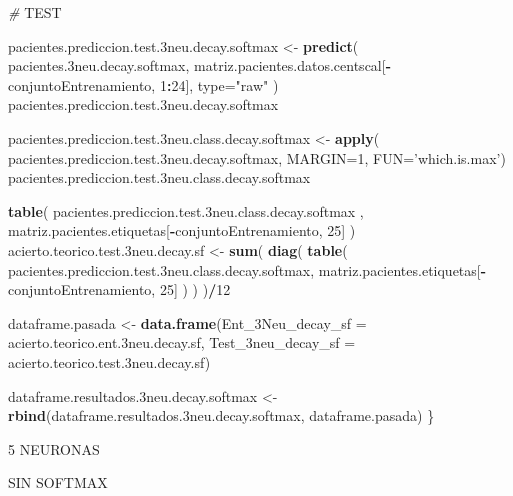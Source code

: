 \documentclass[]{article}
\newenvironment{Shaded}{\begin{snugshade}}{\end{snugshade}}
\newcommand{\KeywordTok}[1]{\textcolor[rgb]{0.13,0.29,0.53}{\textbf{#1}}}
\newcommand{\DataTypeTok}[1]{\textcolor[rgb]{0.13,0.29,0.53}{#1}}
\newcommand{\DecValTok}[1]{\textcolor[rgb]{0.00,0.00,0.81}{#1}}
\newcommand{\StringTok}[1]{\textcolor[rgb]{0.31,0.60,0.02}{#1}}
\newcommand{\CommentTok}[1]{\textcolor[rgb]{0.56,0.35,0.01}{\textit{#1}}}
\newcommand{\OperatorTok}[1]{\textcolor[rgb]{0.81,0.36,0.00}{\textbf{#1}}}
\newcommand{\AlertTok}[1]{\textcolor[rgb]{0.94,0.16,0.16}{#1}}
\newcommand{\NormalTok}[1]{#1}
\begin{document}
\begin{Shaded}
\begin{Highlighting}[]
  \CommentTok{# }\AlertTok{TEST}
  
\NormalTok{  pacientes.prediccion.test.3neu.decay.softmax <-}\StringTok{ }\KeywordTok{predict}\NormalTok{( pacientes.3neu.decay.softmax, matriz.pacientes.datos.centscal[}\OperatorTok{-}\NormalTok{conjuntoEntrenamiento, }\DecValTok{1}\OperatorTok{:}\DecValTok{24}\NormalTok{], }\DataTypeTok{type=}\StringTok{"raw"}\NormalTok{ )}
\NormalTok{  pacientes.prediccion.test.3neu.decay.softmax}
  
\NormalTok{  pacientes.prediccion.test.3neu.class.decay.softmax <-}\StringTok{ }\KeywordTok{apply}\NormalTok{( pacientes.prediccion.test.3neu.decay.softmax, }\DataTypeTok{MARGIN=}\DecValTok{1}\NormalTok{, }\DataTypeTok{FUN=}\StringTok{'which.is.max'}\NormalTok{)}
\NormalTok{  pacientes.prediccion.test.3neu.class.decay.softmax}
  
  \KeywordTok{table}\NormalTok{( pacientes.prediccion.test.3neu.class.decay.softmax , matriz.pacientes.etiquetas[}\OperatorTok{-}\NormalTok{conjuntoEntrenamiento, }\DecValTok{25}\NormalTok{] )}
\NormalTok{  acierto.teorico.test.3neu.decay.sf <-}\StringTok{ }\KeywordTok{sum}\NormalTok{( }\KeywordTok{diag}\NormalTok{( }\KeywordTok{table}\NormalTok{( pacientes.prediccion.test.3neu.class.decay.softmax, matriz.pacientes.etiquetas[}\OperatorTok{-}\NormalTok{conjuntoEntrenamiento, }\DecValTok{25}\NormalTok{] ) ) )}\OperatorTok{/}\DecValTok{12}
  
  
\NormalTok{  dataframe.pasada <-}\StringTok{ }\KeywordTok{data.frame}\NormalTok{(}\DataTypeTok{Ent_3Neu_decay_sf =}\NormalTok{ acierto.teorico.ent.3neu.decay.sf,}
                                 \DataTypeTok{Test_3neu_decay_sf =}\NormalTok{ acierto.teorico.test.3neu.decay.sf)}
  
\NormalTok{  dataframe.resultados.3neu.decay.softmax <-}\StringTok{ }\KeywordTok{rbind}\NormalTok{(dataframe.resultados.3neu.decay.softmax, dataframe.pasada)}
\NormalTok{\}}
\end{Highlighting}
\end{Shaded}

5 NEURONAS

SIN SOFTMAX
\end{document}
